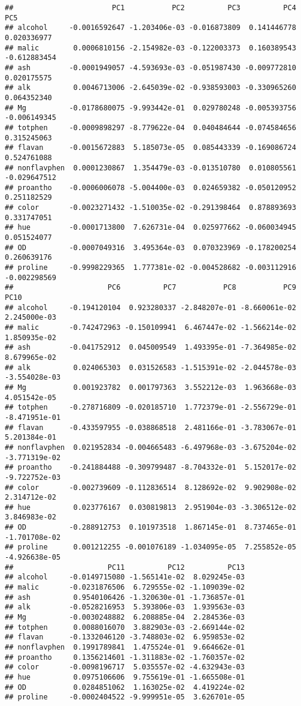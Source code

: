 \documentclass[
]{book}
\begin{document}
\begin{verbatim}
##                       PC1           PC2          PC3          PC4          PC5
## alcohol     -0.0016592647 -1.203406e-03 -0.016873809  0.141446778  0.020336977
## malic        0.0006810156 -2.154982e-03 -0.122003373  0.160389543 -0.612883454
## ash         -0.0001949057 -4.593693e-03 -0.051987430 -0.009772810  0.020175575
## alk          0.0046713006 -2.645039e-02 -0.938593003 -0.330965260  0.064352340
## Mg          -0.0178680075 -9.993442e-01  0.029780248 -0.005393756 -0.006149345
## totphen     -0.0009898297 -8.779622e-04  0.040484644 -0.074584656  0.315245063
## flavan      -0.0015672883  5.185073e-05  0.085443339 -0.169086724  0.524761088
## nonflavphen  0.0001230867  1.354479e-03 -0.013510780  0.010805561 -0.029647512
## proantho    -0.0006006078 -5.004400e-03  0.024659382 -0.050120952  0.251182529
## color       -0.0023271432 -1.510035e-02 -0.291398464  0.878893693  0.331747051
## hue         -0.0001713800  7.626731e-04  0.025977662 -0.060034945  0.051524077
## OD          -0.0007049316  3.495364e-03  0.070323969 -0.178200254  0.260639176
## proline     -0.9998229365  1.777381e-02 -0.004528682 -0.003112916 -0.002298569
##                      PC6          PC7           PC8           PC9          PC10
## alcohol     -0.194120104  0.923280337 -2.848207e-01 -8.660061e-02  2.245000e-03
## malic       -0.742472963 -0.150109941  6.467447e-02 -1.566214e-02  1.850935e-02
## ash         -0.041752912  0.045009549  1.493395e-01 -7.364985e-02  8.679965e-02
## alk          0.024065303  0.031526583 -1.515391e-02 -2.044578e-03 -3.554028e-03
## Mg           0.001923782  0.001797363  3.552212e-03  1.963668e-03  4.051542e-05
## totphen     -0.278716809 -0.020185710  1.772379e-01 -2.556729e-01 -8.471951e-01
## flavan      -0.433597955 -0.038868518  2.481166e-01 -3.783067e-01  5.201384e-01
## nonflavphen  0.021952834 -0.004665483 -6.497968e-03 -3.675204e-02 -3.771319e-02
## proantho    -0.241884488 -0.309799487 -8.704332e-01  5.152017e-02 -9.722752e-03
## color       -0.002739609 -0.112836514  8.128692e-02  9.902908e-02  2.314712e-02
## hue          0.023776167  0.030819813  2.951904e-03 -3.306512e-02  3.846983e-02
## OD          -0.288912753  0.101973518  1.867145e-01  8.737465e-01 -1.701708e-02
## proline      0.001212255 -0.001076189 -1.034095e-05  7.255852e-05 -4.926638e-05
##                      PC11          PC12          PC13
## alcohol     -0.0149715080 -1.565141e-02  8.029245e-03
## malic       -0.0231876506  6.729555e-02 -1.109039e-02
## ash          0.9540106426 -1.320630e-01 -1.736857e-01
## alk         -0.0528216953  5.393806e-03  1.939563e-03
## Mg          -0.0030248882  6.208885e-04  2.284536e-03
## totphen      0.0088016070  3.882903e-03 -2.669144e-02
## flavan      -0.1332046120 -3.748803e-02  6.959853e-02
## nonflavphen  0.1991789841  1.475524e-01  9.664662e-01
## proantho     0.1356214601 -1.311883e-02 -1.760357e-02
## color       -0.0098196717  5.035557e-02 -4.632943e-03
## hue          0.0975106606  9.755619e-01 -1.665508e-01
## OD           0.0284851062  1.163025e-02  4.419224e-02
## proline     -0.0002404522 -9.999951e-05  3.626701e-05
\end{verbatim}
\end{document}

